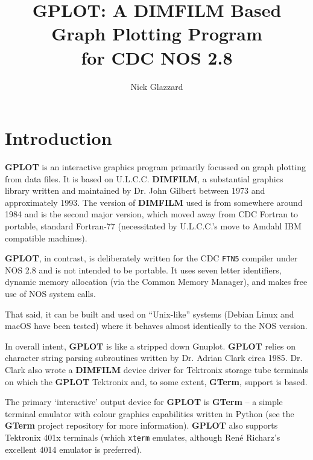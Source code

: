 \documentclass[a4paper,twoside,11pt]{article}
\newcommand{\newpara}{\par\vspace{4mm}\noindent}
\begin{document}
\title{\textbf{GPLOT}: A \textbf{DIMFILM} Based Graph Plotting Program \\ for CDC NOS 2.8}
\author{Nick Glazzard}
\maketitle






\section{Introduction}
\textbf{GPLOT} is an interactive graphics program primarily focussed on graph plotting from data files.
It is based on U.L.C.C. \textbf{DIMFILM}, a substantial graphics library written and maintained
by Dr. John Gilbert between 1973 and approximately 1993. The version of \textbf{DIMFILM} used is
from somewhere around 1984 and is the second major version, which moved away from CDC Fortran
to portable, standard Fortran-77 (necessitated by U.L.C.C.'s move to Amdahl IBM compatible machines). 
\newpara
\textbf{GPLOT}, in contrast, is deliberately written for the CDC \texttt{FTN5} compiler under NOS 2.8 and
is not intended to be portable. It uses seven letter identifiers, dynamic memory allocation (via
the Common Memory Manager), and makes free use of NOS system calls.
\newpara
That said, it can be built and used on ``Unix-like'' systems (Debian Linux and macOS have been tested)
where it behaves almost identically to the NOS version.
\newpara
In overall intent, \textbf{GPLOT} is like a stripped down Gnuplot. 
\textbf{GPLOT} relies on character
string parsing subroutines written by Dr. Adrian Clark circa 1985. Dr. Clark also wrote a \textbf{DIMFILM} device
driver for Tektronix storage tube terminals on which the \textbf{GPLOT} Tektronix and, to some extent, \textbf{GTerm}, support
is based.
\newpara
The primary `interactive' output device for \textbf{GPLOT} is \textbf{GTerm} -- a simple terminal emulator with colour graphics
capabilities written in Python (see the \textbf{GTerm} project repository for more information). \textbf{GPLOT} also 
supports Tektronix 401x terminals (which \texttt{xterm} emulates, although Ren\'{e} Richarz's
excellent 4014 emulator is preferred).
\end{document}
